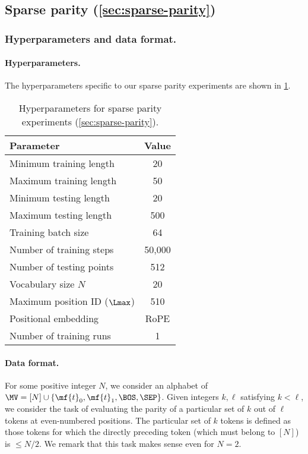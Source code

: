 \documentclass{article}
\begin{document}
\subsection{Sparse parity (\cref{sec:sparse-parity})}

\subsubsection{Hyperparameters and data format.}
\label{sec:data-format-sparse-parity}
\paragraph{Hyperparameters.} The hyperparameters specific to our sparse parity experiments are shown in \cref{tab:sparse-parity-params}. 
\begin{table}[ht]
\centering
\begin{tabular}{l c}
\hline
\textbf{Parameter} & \textbf{Value} \\
\hline
Minimum training length & 20 \\
Maximum training length & 50 \\
Minimum testing length  & 20 \\
Maximum testing length  & 500 \\
Training batch size     & 64 \\
Number of training steps & 50,000 \\
Number of testing points & 512 \\
Vocabulary size $N$        & 20 \\
  Maximum position ID ($\Lmax$) & 510 \\
  Positional embedding & RoPE \\
  Number of training runs & 1 \\
\hline
\end{tabular}
\caption{Hyperparameters for sparse parity experiments (\cref{sec:sparse-parity}).}
\label{tab:sparse-parity-params}
\end{table}

\paragraph{Data format.} For some positive integer $N$, we consider an alphabet of $\MV = [N] \cup \{ \mf{t}_0, \mf{t}_1, \BOS, \SEP \}$. Given integers $k,\ell$ satisfying $k < \ell$, we consider the task of evaluating the parity of a particular set of $k$ out of $\ell$ tokens at even-numbered positions. The particular set of $k$ tokens is defined as those tokens for which the directly preceding token (which must belong to $[N]$) is $\leq N/2$. We remark that this task makes sense even for $N = 2$. 
\end{document}
